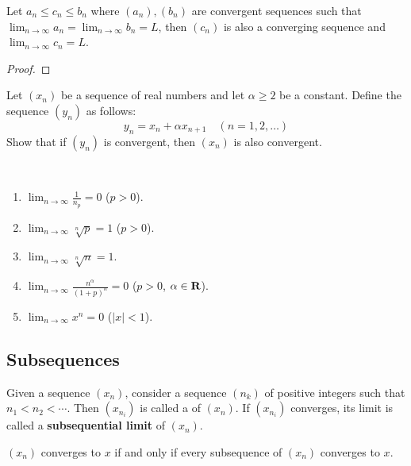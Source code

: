 \begin{theorem}
Let $a_n\le c_n\le b_n$ where $(a_n),(b_n)$ are convergent sequences such that $\displaystyle\lim_{n\to\infty}a_n=\lim_{n\to\infty}b_n=L$, then $(c_n)$ is also a converging sequence and $\displaystyle\lim_{n\to\infty}c_n=L$.
\end{theorem}

\begin{proof}

\end{proof}

\begin{exercise}
Let $(x_n)$ be a sequence of real numbers and let $\alpha\ge2$ be a constant. Define the sequence $(y_n)$ as follows:
\[y_n=x_n+\alpha x_{n+1}\quad(n=1,2,\dots)\]
Show that if $(y_n)$ is convergent, then $(x_n)$ is also convergent.
\end{exercise}

\begin{exercise} \
\begin{enumerate}[label=(\roman*)]
\item $\displaystyle\lim_{n\to\infty}\frac{1}{n_p}=0$ ($p>0$).
\item $\displaystyle\lim_{n\to\infty}\sqrt[n]{p}=1$ ($p>0$).
\item $\displaystyle\lim_{n\to\infty}\sqrt[n]{n}=1$.
\item $\displaystyle\lim_{n\to\infty}\frac{n^\alpha}{(1+p)^n}=0$ ($p>0$, $\alpha\in\mathbf R$).
\item $\displaystyle\lim_{n\to\infty}x^n=0$ ($|x|<1$).
\end{enumerate}
\end{exercise}

\subsection{Subsequences}
\begin{definition}[Subsequence]
Given a sequence $(x_n)$, consider a sequence $(n_k)$ of positive integers such that $n_1<n_2<\cdots$. Then $(x_{n_i})$ is called a  of $(x_n)$. If $(x_{n_i})$ converges, its limit is called a \textbf{subsequential limit} of $(x_n)$.
\end{definition}

\begin{proposition}
$(x_n)$ converges to $x$ if and only if every subsequence of $(x_n)$ converges to $x$.
\end{proposition}

